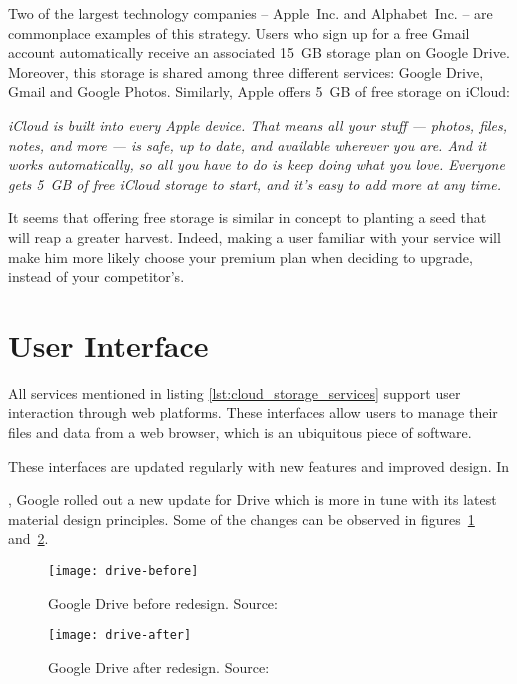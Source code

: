 Two of the largest technology companies -- \mbox{Apple Inc.} and \mbox{Alphabet Inc.} -- are commonplace examples of this strategy. Users who sign up for a free Gmail account automatically receive an associated \mbox{15 GB} storage plan on Google Drive. Moreover, this storage is shared among three different services: Google Drive, Gmail and Google Photos. Similarly, Apple offers \mbox{5 GB} of free storage on iCloud:

\begin{quoting}[vskip=0pt]
\emph{iCloud is built into every Apple device. That means all your stuff — photos, files, notes, and more — is safe, up to date, and available wherever you are. And it works automatically, so all you have to do is keep doing what you love. Everyone gets \mbox{5 GB} of free iCloud storage to start, and it’s easy to add more at any time.}~\cite{icloud_website}
\end{quoting}

It seems that offering free storage is similar in concept to planting a seed that will reap a greater harvest. Indeed, making a user familiar with your service will make him more likely choose your premium plan when deciding to upgrade, instead of your competitor's.

\section{User Interface}

All services mentioned in listing \ref{lst:cloud_storage_services} support user interaction through web platforms. These interfaces allow users to manage their files and data from a web browser, which is an ubiquitous piece of software.

These interfaces are updated regularly with new features and improved design. In \date{May 2018}, Google rolled out a new update\cite{google_drive_ui_updates} for Drive which is more in tune with its latest material design principles\cite{how_google_created_a_custom_material_theme}. Some of the changes can be observed in figures~\ref{fig:drive-before} and~\ref{fig:drive-after}.

\begin{figure}[bpt]
\caption{Google Drive before redesign. Source:~\cite{google_drive_ui_updates}}
\label{fig:drive-before}
\centering
\texttt{[image: drive-before]}
\end{figure}

\begin{figure}[bpt]
\caption{Google Drive after redesign. Source:~\cite{google_drive_ui_updates}}
\label{fig:drive-after}
\centering
\texttt{[image: drive-after]}
\end{figure}


